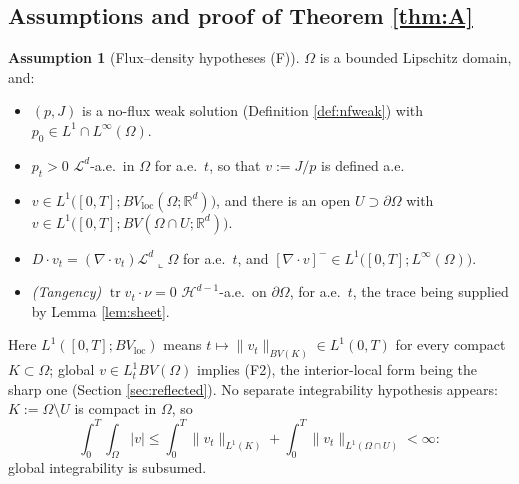 \documentclass[11pt]{amsart}
\theoremstyle{definition}
\newtheorem{assumption}[theorem]{Assumption}
\newcommand{\Ld}{\mathcal{L}^d}
\newcommand{\Hd}{\mathcal{H}^{d-1}}
\newcommand{\tr}{\operatorname{tr}}
\newcommand{\dive}{\nabla\!\cdot}
\newcommand{\R}{\mathbb{R}}
\begin{document}
\subsection{Assumptions and proof of Theorem \ref{thm:A}}

\begin{assumption}[Flux--density hypotheses (F)]\label{ass:F}
$\Omega$ is a bounded Lipschitz domain, and:
\begin{itemize}
\item[(F0)] $(p,J)$ is a no-flux weak solution (Definition
\ref{def:nfweak}) with $p_0\in L^1\cap L^\infty(\Omega)$.
\item[(F1)] $p_t>0$ $\Ld$-a.e.\ in $\Omega$ for a.e.\ $t$, so that
$v:=J/p$ is defined a.e.
\item[(F2)] $v\in L^1\big([0,T];BV_{\mathrm{loc}}(\Omega;\R^d)\big)$,
and there is an open $U\supset\partial\Omega$ with $v\in
L^1\big([0,T];BV(\Omega\cap U;\R^d)\big)$.
\item[(F3)] $D\!\cdot v_t=(\dive v_t)\Ld\llcorner\Omega$ for
a.e.\ $t$, and $[\dive v]^-\in
L^1\big([0,T];L^\infty(\Omega)\big)$.
\item[(F4)] \emph{(Tangency)} $\tr v_t\cdot\nu=0$ $\Hd$-a.e.\ on
$\partial\Omega$, for a.e.\ $t$, the trace being supplied by Lemma
\ref{lem:sheet}.
\end{itemize}
\end{assumption}

Here $L^1([0,T];BV_{\mathrm{loc}})$ means
$t\mapsto\|v_t\|_{BV(K)}\in L^1(0,T)$ for every compact
$K\subset\Omega$; global $v\in L^1_tBV(\Omega)$ implies (F2), the
interior-local form being the sharp one (Section
\ref{sec:reflected}). No separate integrability hypothesis appears:
$K:=\Omega\setminus U$ is compact in $\Omega$, so
\begin{equation}\label{eq:subsumed}
\int_0^T\!\!\int_\Omega|v|\le
\int_0^T\|v_t\|_{L^1(K)}+\int_0^T\|v_t\|_{L^1(\Omega\cap U)}<\infty:
\end{equation}
global integrability is subsumed.
\end{document}
